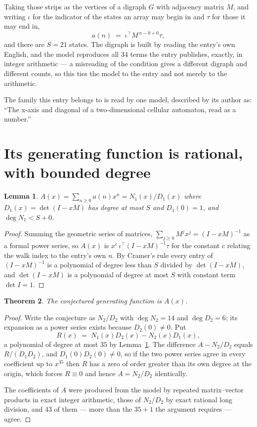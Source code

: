 \documentclass[11pt,a4paper]{article}
\theoremstyle{plain}
\newtheorem{theorem}{Theorem}
\newtheorem{lemma}[theorem]{Lemma}
\theoremstyle{definition}
\begin{document}
Taking those strips as the vertices of a digraph $G$ with adjacency matrix $M$, and writing
$\iota$ for the indicator of the states an array may begin in and $\tau$ for those it may end
in,
\[
a(n)\;=\;\iota^{\!\top}M^{\,n-0+0}\tau ,
\]
and there are $S=21$ states. The digraph is built by reading the entry's own English, and the
model reproduces all $34$ terms the entry publishes, exactly, in integer arithmetic --- a
misreading of the condition gives a different digraph and different counts, so this ties the
model to the entry and not merely to the arithmetic.

The family this entry belongs to is read by one model, described by its author as: ``The x-axis and diagonal of a two-dimensional cellular automaton, read as a number.''


\section{Its generating function is rational, with bounded degree}

\begin{lemma}\label{lem:rat}
$A(x)=\sum_{n\ge0}a(n)x^n=N_1(x)/D_1(x)$ where $D_1(x)=\det(I-xM)$ has degree at most
$S$ and $D_1(0)=1$, and $\deg N_1<S+0$.
\end{lemma}

\begin{proof}
Summing the geometric series of matrices, $\sum_{j\ge0}M^jx^j=(I-xM)^{-1}$ as a formal
power series, so $A(x)$ is $x^{c}\,\iota^{\!\top}(I-xM)^{-1}\tau$ for the constant $c$
relating the walk index to the entry's own $n$. By Cramer's rule every entry of
$(I-xM)^{-1}$ is a polynomial of degree less than $S$ divided by $\det(I-xM)$, and
$\det(I-xM)$ is a polynomial of degree at most $S$ with constant term $\det I=1$.
\end{proof}

\begin{theorem}
The conjectured generating function is $A(x)$.
\end{theorem}

\begin{proof}
Write the conjecture as $N_2/D_2$ with $\deg N_2=14$ and $\deg D_2=6$; its expansion as a
power series exists because $D_2(0)\neq0$. Put
\[
R(x)\;=\;N_1(x)D_2(x)-N_2(x)D_1(x),
\]
a polynomial of degree at most $35$ by Lemma~\ref{lem:rat}. The difference
$A-N_2/D_2$ equals $R/(D_1D_2)$, and $D_1(0)D_2(0)\neq0$, so if the two power series agree in
every coefficient up to $x^{35}$ then $R$ has a zero of order greater than its own
degree at the origin, which forces $R\equiv0$ and hence $A=N_2/D_2$ identically.

The coefficients of $A$ were produced from the model by repeated matrix--vector products in
exact integer arithmetic, those of $N_2/D_2$ by exact rational long division, and $43$
of them --- more than the $35+1$ the argument requires --- agree.
\end{proof}
\end{document}
